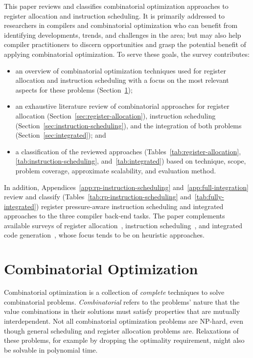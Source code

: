 \documentclass[acmsmall,authorversion,nonacm]{acmart}
\begin{document}
This paper reviews and classifies combinatorial optimization
approaches to register allocation and instruction scheduling.
It is primarily addressed to researchers in compilers and
combinatorial optimization who can benefit from identifying
developments, trends, and challenges in the area; but may also help
compiler practitioners to discern opportunities and grasp the
potential benefit of applying combinatorial optimization.
To serve these goals, the survey contributes:
\begin{itemize}
\item an overview of combinatorial optimization techniques used for
  register allocation and instruction scheduling with a focus on the
  most relevant aspects for these problems
  (Section~\ref{sec:combinatorial-optimization});
\item an exhaustive literature review of combinatorial approaches for
  register allocation (Section~\ref{sec:register-allocation}),
  instruction scheduling (Section~\ref{sec:instruction-scheduling}),
  and the integration of both problems (Section~\ref{sec:integrated});
  and
\item a classification of the reviewed approaches
  (Tables~\ref{tab:register-allocation},
  \ref{tab:instruction-scheduling}, and~\ref{tab:integrated}) based on
  technique, scope, problem coverage, approximate scalability, and
  evaluation method.
\end{itemize}

In addition, Appendices~\ref{app:rp-instruction-scheduling}
and~\ref{app:full-integration} review and classify
(Tables~\ref{tab:rp-instruction-scheduling}
and~\ref{tab:fully-integrated}) register pressure-aware instruction
scheduling and integrated approaches to the three compiler back-end
tasks.
The paper complements available surveys of register
allocation~\cite{Johnsson1973,Rajlich1984,Nandivada2007b,PereiraSurvey2008,Protzenko2009},
instruction
scheduling~\cite{Rau1993,Allan1995,DeDinechin2004,Govindarajan2007,Rong2007},
and integrated code generation~\cite{Kessler2010}, whose focus tends
to be on heuristic approaches.

\section{Combinatorial Optimization}\label{sec:combinatorial-optimization}

Combinatorial optimization is a collection of \emph{complete}
techniques to solve combinatorial problems.
\emph{Combinatorial} refers to the problems' nature that the value
combinations in their solutions must satisfy properties that are
mutually interdependent. Not all combinatorial optimization problems
are NP-hard, even though general scheduling and register allocation
problems are. Relaxations of these problems, for example by dropping
the optimality requirement, might also be solvable in polynomial time.
\end{document}
